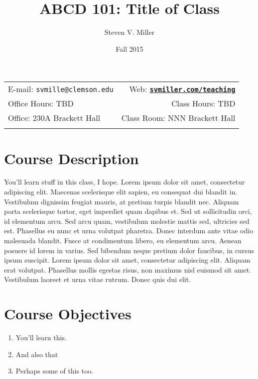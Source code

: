 \documentclass[11pt]{article}
\title{ABCD 101: Title of Class}
\author{Steven V. Miller}
\date{Fall 2015}
\newcommand{\blankline}{\quad\pagebreak[2]}
\begin{document}
\maketitle

\blankline

\begin{tabular*}{.93\textwidth}{@{\extracolsep{\fill}}lr}


  E-mail: \texttt{svmille@clemson.edu} & Web: \href{http://svmiller.com/teaching}{\tt\bf svmiller.com/teaching}  \\

 Office Hours: TBD  &  Class Hours: TBD \\


 Office: 230A Brackett Hall & Class Room: NNN Brackett Hall \\
&  \\
\hline
\end{tabular*}

\vspace{10 mm}

\section*{Course Description}

You'll learn stuff in this class, I hope. Lorem ipsum dolor sit amet, consectetur adipiscing elit. Maecenas scelerisque elit sapien, eu consequat dui blandit in. Vestibulum dignissim feugiat mauris, at pretium turpis blandit nec. Aliquam porta scelerisque tortor, eget imperdiet quam dapibus et. Sed ut sollicitudin orci, id elementum arcu. Sed arcu quam, vestibulum molestie mattis sed, ultricies sed est. Phasellus eu nunc et urna volutpat pharetra. Donec interdum ante vitae odio malesuada blandit. Fusce at condimentum libero, eu elementum arcu. Aenean posuere id lorem in varius. Sed bibendum neque pretium dolor faucibus, in cursus ipsum suscipit. Lorem ipsum dolor sit amet, consectetur adipiscing elit. Aliquam erat volutpat. Phasellus mollis egestas risus, non maximus nisl euismod sit amet. Vestibulum laoreet et urna vitae rutrum. Donec quis dui elit.

\section*{Course Objectives}
\begin{enumerate}
\item You'll learn this.
\item And also that
\item Perhaps some of this too.
\end{enumerate}
\end{document}
